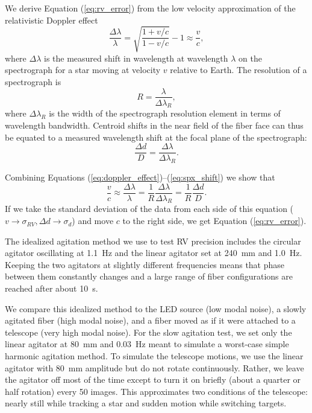 We derive Equation (\ref{eq:rv_error}) from the low velocity approximation of the relativistic Doppler effect
\begin{equation}
\frac{\Delta \lambda}{\lambda} = \sqrt{\frac{1 + v/c}{1-v/c}} - 1 \approx \frac{v}{c},
\label{eq:doppler_effect}
\end{equation}
where $\Delta \lambda$ is the measured shift in wavelength at wavelength $\lambda$ on the spectrograph for a star moving at velocity $v$ relative to Earth. The resolution of a spectrograph is
\begin{equation}
R = \frac{\lambda}{\Delta \lambda_R},
\label{eq:resolution}
\end{equation}
where $\Delta \lambda_R$ is the width of the spectrograph resolution element in terms of wavelength bandwidth. Centroid shifts in the near field of the fiber face can thus be equated to a measured wavelength shift at the focal plane of the spectrograph:
\begin{equation}
\frac{\Delta d}{D} = \frac{\Delta \lambda}{\Delta \lambda_R}.
\label{eq:spx_shift}
\end{equation}

Combining Equations (\ref{eq:doppler_effect})--(\ref{eq:spx_shift}) we show that
\begin{equation}
\frac{v}{c} \approx \frac{\Delta \lambda}{\lambda} = \frac{1}{R} \frac{\Delta \lambda}{\Delta \lambda_R} = \frac{1}{R} \frac{\Delta d}{D}.
\end{equation}
If we take the standard deviation of the data from each side of this equation ($v \rightarrow \sigma_{RV}, \Delta d \rightarrow \sigma_d$) and move $c$ to the right side, we get Equation (\ref{eq:rv_error}).

The idealized agitation method we use to test RV precision includes the circular agitator oscillating at \SI{1.1}{\hertz} and the linear agitator set at \SI{240}{\milli\meter} and \SI{1.0}{\hertz}. Keeping the two agitators at slightly different frequencies means that phase between them constantly changes and a large range of fiber configurations are reached after about \SI{10}{\second}.

We compare this idealized method to the LED source (low modal noise), a slowly agitated fiber (high modal noise), and a fiber moved as if it were attached to a telescope (very high modal noise). For the slow agitation test, we set only the linear agitator at \SI{80}{\milli\meter} and \SI{0.03}{\hertz} meant to simulate a worst-case simple harmonic agitation method. To simulate the telescope motions, we use the linear agitator with \SI{80}{\milli\meter} amplitude but do not rotate continuously. Rather, we leave the agitator off most of the time except to turn it on briefly (about a quarter or half rotation) every 50 images. This approximates two conditions of the telescope: nearly still while tracking a star and sudden motion while switching targets.

